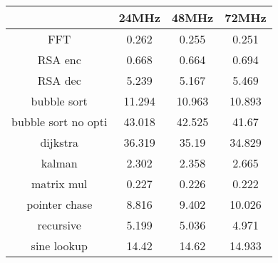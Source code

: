 \begin{table}
    \centering
    \begin{tabular}{||c c c c||}
    \hline
        ~ & 24MHz & 48MHz & 72MHz \\ [0.5ex] 
        \hline \hline
        FFT & 0.262 & 0.255 & 0.251 \\ 
        RSA enc & 0.668 & 0.664 & 0.694 \\ 
        RSA dec & 5.239 & 5.167 & 5.469 \\ 
        bubble sort & 11.294 & 10.963 & 10.893 \\ 
        bubble sort no opti & 43.018 & 42.525 & 41.67 \\ 
        dijkstra & 36.319 & 35.19 & 34.829 \\ 
        kalman & 2.302 & 2.358 & 2.665 \\ 
        matrix mul & 0.227 & 0.226 & 0.222 \\ 
        pointer chase & 8.816 & 9.402 & 10.026 \\ 
        recursive & 5.199 & 5.036 & 4.971 \\ 
        sine lookup & 14.42 & 14.62 & 14.933 \\ [1ex] \hline
    \end{tabular}
\end{table}